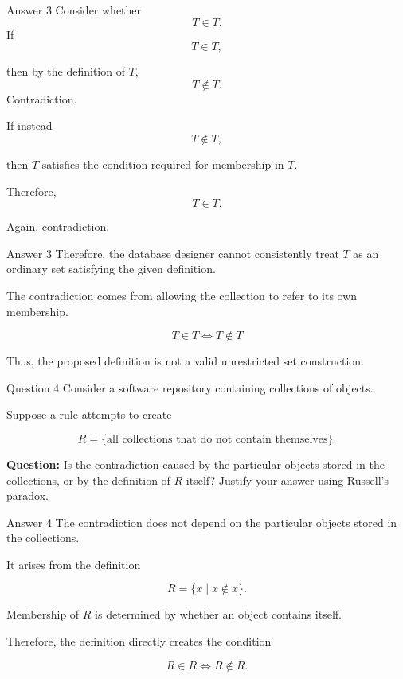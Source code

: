 \begin{frame}{Answer 3}
Consider whether
$$
T\in T.
$$
If
$$
T\in T,
$$

then by the definition of $T$,
$$
T\notin T.
$$
Contradiction.

If instead
$$
T\notin T,
$$

then $T$ satisfies the condition required for membership in $T$.

Therefore,
$$
T\in T.
$$

Again, contradiction.
\end{frame}

\begin{frame}{Answer 3}
Therefore, the database designer cannot consistently treat $T$ as an ordinary set satisfying the given definition.

The contradiction comes from allowing the collection to refer to its own membership.

$$
\boxed{
T\in T\iff T\notin T
}
$$

Thus, the proposed definition is not a valid unrestricted set construction.
\end{frame}


\begin{frame}{Question 4}
Consider a software repository containing collections of objects.

Suppose a rule attempts to create

$$
R=\{\text{all collections that do not contain themselves}\}.
$$

\textbf{Question:} Is the contradiction caused by the particular objects stored in the collections, or by the definition of $R$ itself? Justify your answer using Russell's paradox.
\end{frame}

\begin{frame}{Answer 4}
The contradiction does not depend on the particular objects stored in the collections.

It arises from the definition

$$
R=\{x\mid x\notin x\}.
$$

Membership of $R$ is determined by whether an object contains itself.

Therefore, the definition directly creates the condition

$$
R\in R
\iff
R\notin R.
$$

\end{frame}

